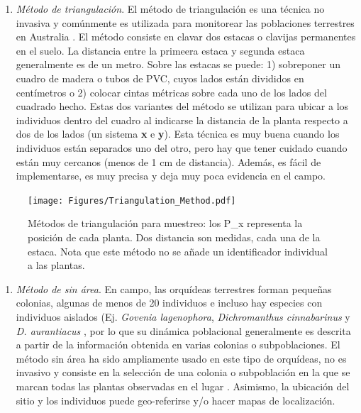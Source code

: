 \documentclass[
]{book}
\providecommand{\tightlist}{%
  \setlength{\itemsep}{0pt}\setlength{\parskip}{0pt}}
\theoremstyle{definition}
\theoremstyle{definition}
\theoremstyle{definition}
\theoremstyle{definition}
\theoremstyle{remark}
\begin{document}
\begin{enumerate}
\def\labelenumi{\alph{enumi})}
\tightlist
\item
  \emph{Método de triangulación}. El método de triangulación es una técnica no invasiva y comúnmente es utilizada para monitorear las poblaciones terrestres en Australia \citep{tremblay2009population}. El método consiste en clavar dos estacas o clavijas permanentes en el suelo. La distancia entre la primeera estaca y segunda estaca generalmente es de un metro. Sobre las estacas se puede: 1) sobreponer un cuadro de madera o tubos de PVC, cuyos lados están divididos en centímetros o 2) colocar cintas métricas sobre cada uno de los lados del cuadrado hecho. Estas dos variantes del método se utilizan para ubicar a los individuos dentro del cuadro al indicarse la distancia de la planta respecto a dos de los lados (un sistema \textbf{x} e \textbf{y}). Esta técnica es muy buena cuando los individuos están separados uno del otro, pero hay que tener cuidado cuando están muy cercanos (menos de 1 cm de distancia). Además, es fácil de implementarse, es muy precisa y deja muy poca evidencia en el campo.
\end{enumerate}

\begin{figure}
\centering
\texttt{[image: Figures/Triangulation\_Method.pdf]}
\caption{Métodos de triangulación para muestreo: los P\_x representa la posición de cada planta. Dos distancia son medidas, cada una de la estaca. Nota que este método no se añade un identificador individual a las plantas.}
\end{figure}

\begin{enumerate}
\def\labelenumi{\alph{enumi})}
\setcounter{enumi}{1}
\tightlist
\item
  \emph{Método de sin área}. En campo, las orquídeas terrestres forman pequeñas colonias, algunas de menos de 20 individuos e incluso hay especies con individuos aislados (Ej. \emph{Govenia lagenophora}, \emph{Dichromanthus cinnabarinus} y \emph{D. aurantiacus} \citep{tellez2007orquideas}, por lo que su dinámica poblacional generalmente es descrita a partir de la información obtenida en varias colonias o subpoblaciones. El método sin área ha sido ampliamente usado en este tipo de orquídeas, no es invasivo y consiste en la selección de una colonia o subpoblación en la que se marcan todas las plantas observadas en el lugar \citep{martinez2024estimation}. Asimismo, la ubicación del sitio y los individuos puede geo-referirse y/o hacer mapas de localización.
\end{enumerate}
\end{document}
